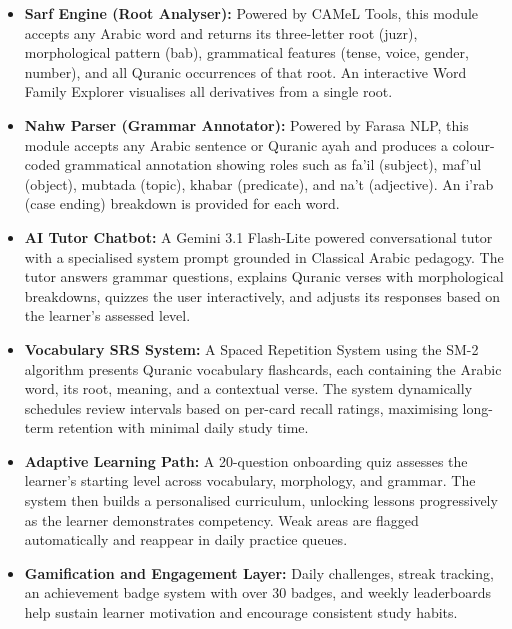 \documentclass[A4paper,12pt]{article}
\begin{document}
\begin{itemize}[leftmargin=1.5em]
    \item \textbf{Sarf Engine (Root Analyser):} Powered by CAMeL Tools, this module accepts any
    Arabic word and returns its three-letter root (juzr), morphological pattern (bab), grammatical
    features (tense, voice, gender, number), and all Quranic occurrences of that root. An
    interactive Word Family Explorer visualises all derivatives from a single root.

    \item \textbf{Nahw Parser (Grammar Annotator):} Powered by Farasa NLP, this module accepts
    any Arabic sentence or Quranic ayah and produces a colour-coded grammatical annotation
    showing roles such as fa'il (subject), maf'ul (object), mubtada (topic), khabar (predicate),
    and na't (adjective). An i'rab (case ending) breakdown is provided for each word.

    \item \textbf{AI Tutor Chatbot:} A Gemini 3.1 Flash-Lite powered conversational tutor with a
    specialised system prompt grounded in Classical Arabic pedagogy. The tutor answers grammar
    questions, explains Quranic verses with morphological breakdowns, quizzes the user
    interactively, and adjusts its responses based on the learner's assessed level.

    \item \textbf{Vocabulary SRS System:} A Spaced Repetition System using the SM-2 algorithm
    presents Quranic vocabulary flashcards, each containing the Arabic word, its root, meaning,
    and a contextual verse. The system dynamically schedules review intervals based on per-card
    recall ratings, maximising long-term retention with minimal daily study time.

    \item \textbf{Adaptive Learning Path:} A 20-question onboarding quiz assesses the learner's
    starting level across vocabulary, morphology, and grammar. The system then builds a
    personalised curriculum, unlocking lessons progressively as the learner demonstrates
    competency. Weak areas are flagged automatically and reappear in daily practice queues.

    \item \textbf{Gamification and Engagement Layer:} Daily challenges, streak tracking, an achievement
    badge system with over 30 badges, and weekly leaderboards help sustain learner motivation
    and encourage consistent study habits.
\end{itemize}
\end{document}
